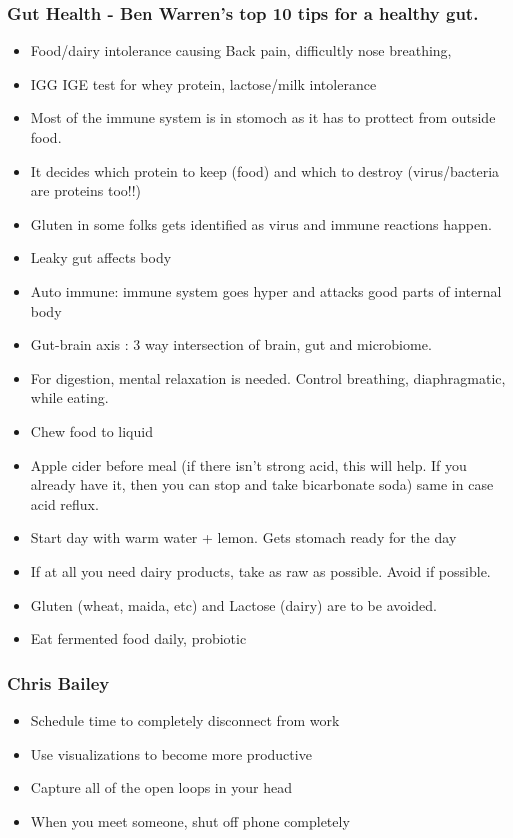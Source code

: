 \begin{frame}[fragile]\frametitle{Gut Health - Ben Warren's top 10 tips for a healthy gut.}

	\begin{itemize}
	\item Food/dairy intolerance causing Back pain, difficultly nose breathing, 
	\item IGG IGE test for whey protein, lactose/milk intolerance
	\item Most of the immune system is in stomoch as it has to prottect from outside food.
	\item It decides which protein to keep (food) and which to destroy (virus/bacteria are proteins too!!)
	\item Gluten in some folks gets identified as virus and immune reactions happen.
	\item Leaky gut affects body
	\item Auto immune: immune system goes hyper and attacks good parts of internal body
	\item Gut-brain axis : 3 way intersection of brain, gut and microbiome.
	\item For digestion, mental relaxation is needed. Control breathing, diaphragmatic, while eating.
	\item Chew food to liquid
	\item Apple cider before meal (if there isn't strong acid, this will help. If you already have it, then you can stop and take bicarbonate soda) same in case acid reflux.
	\item Start day with warm water + lemon. Gets stomach ready for the day
	\item If at all you need dairy products, take as raw as possible. Avoid if possible.
	\item Gluten (wheat, maida, etc) and Lactose (dairy) are to be avoided.
	\item Eat fermented food daily, probiotic
	\end{itemize}

\end{frame}

	

\begin{frame}[fragile]\frametitle{Chris Bailey}

	\begin{itemize}
	\item Schedule time to completely disconnect from work
	\item Use visualizations to become more productive
	\item Capture all of the open loops in your head
	\item When you meet someone, shut off phone completely
	\end{itemize}

\end{frame}


